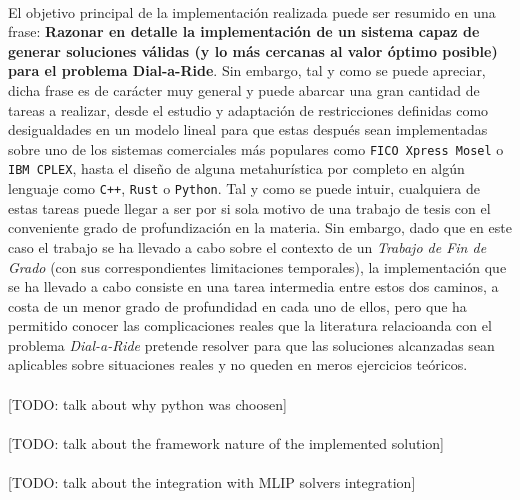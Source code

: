 \documentclass{subfiles}
\begin{document}
        \paragraph{}
        El objetivo principal de la implementación realizada puede ser resumido en una frase: \textbf{Razonar en detalle la implementación de un sistema capaz de generar soluciones válidas (y lo más cercanas al valor óptimo posible) para el problema Dial-a-Ride}. Sin embargo, tal y como se puede apreciar, dicha frase es de carácter muy general y puede abarcar una gran cantidad de tareas a realizar, desde el estudio y adaptación de restricciones definidas como desigualdades en un modelo lineal para que estas después sean implementadas sobre uno de los sistemas comerciales más populares como \texttt{FICO Xpress Mosel} o \texttt{IBM CPLEX}, hasta el diseño de alguna metahurística por completo en algún lenguaje como \texttt{C++}, \texttt{Rust} o \texttt{Python}. Tal y como se puede intuir, cualquiera de estas tareas puede llegar a ser por si sola motivo de una trabajo de tesis con el conveniente grado de profundización en la materia. Sin embargo, dado que en este caso el trabajo se ha llevado a cabo sobre el contexto de un \emph{Trabajo de Fin de Grado} (con sus correspondientes limitaciones temporales), la implementación que se ha llevado a cabo consiste en una tarea intermedia entre estos dos caminos, a costa de un menor grado de profundidad en cada uno de ellos, pero que ha permitido conocer las complicaciones reales que la literatura relacioanda con el problema \emph{Dial-a-Ride} pretende resolver para que las soluciones alcanzadas sean aplicables sobre situaciones reales y no queden en meros ejercicios teóricos.

        \paragraph{}
        [TODO: talk about why python was choosen]

        \paragraph{}
        [TODO: talk about the framework nature of the implemented solution]

        \paragraph{}
        [TODO: talk about the integration with MLIP solvers integration]
\end{document}
